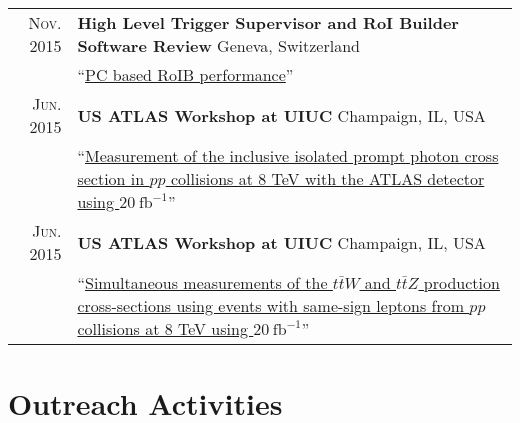 \documentclass[a4paper,10pt]{article}
\begin{document}
\begin{tabular}{rp{15.5cm}}
\textsc{Nov. 2015}		& {\bf High Level Trigger Supervisor and RoI Builder Software Review} \hfill Geneva, Switzerland\\
						& ``\href{https://indico.cern.ch/event/461460/#2-roibuilder-software-incl-dis}{PC based RoIB performance}''  	\\
\textsc{Jun. 2015}		& {\bf US ATLAS Workshop at UIUC} \hfill Champaign, IL, USA\\
						& ``\href{https://indico.cern.ch/event/388328/other-view?view=nicecompact#20150623.detailed}{Measurement of the inclusive isolated prompt photon cross section in $pp$ collisions at 8 TeV with the ATLAS detector using $20\ \mathrm{fb}^{-1}$}''  	\\
\textsc{Jun. 2015}		& {\bf US ATLAS Workshop at UIUC} \hfill Champaign, IL, USA\\
						& ``\href{https://indico.cern.ch/event/388328/other-view?view=nicecompact#20150623.detailed}{Simultaneous measurements of the $t\bar{t}W$ and $t\bar{t}Z$ production cross-sections using events with same-sign leptons from $pp$ collisions at 8 TeV using $20\ \mathrm{fb}^{-1}$}''  	\\
\end{tabular}

\vspace{3mm}
\section{Outreach Activities}
\end{document}
